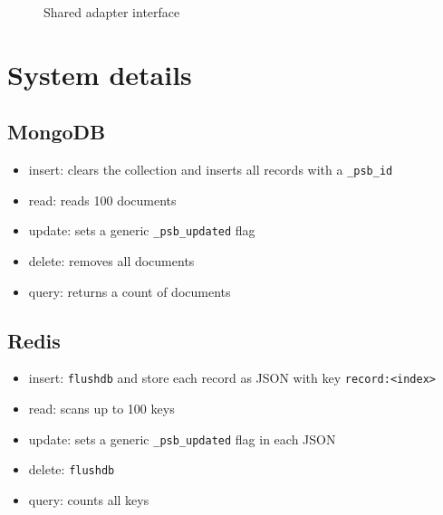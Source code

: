 \documentclass[12pt]{report}
\begin{document}
\begin{figure}[H]
\centering
{}
\caption{Shared adapter interface}
\end{figure}

\chapter{System details}
\section{MongoDB}
\begin{itemize}
  \item insert: clears the collection and inserts all records with a \texttt{\_psb\_id}
  \item read: reads 100 documents
  \item update: sets a generic \texttt{\_psb\_updated} flag
  \item delete: removes all documents
  \item query: returns a count of documents
\end{itemize}

\section{Redis}
\begin{itemize}
  \item insert: \texttt{flushdb} and store each record as JSON with key \texttt{record:<index>}
  \item read: scans up to 100 keys
  \item update: sets a generic \texttt{\_psb\_updated} flag in each JSON
  \item delete: \texttt{flushdb}
  \item query: counts all keys
\end{itemize}
\end{document}
